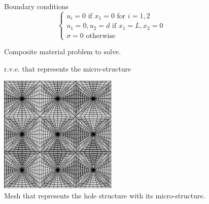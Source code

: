 \begin{figure}[h!]
\fboxsep=0pt
\noindent
\begin{minipage}[t]{0.35\linewidth}
\vspace{0pt}
\begin{flushleft}
\resizebox{6cm}{!}{
 
}
\end{flushleft}
\end{minipage}
\begin{minipage}[t]{0.4\linewidth}
\vspace{0pt}
Boundary conditions
\[
\begin{cases}
   u_i = 0 \text{ if } x_1 = 0 \text{ for } i=1,2\\
   u_1 = 0, u_2 = d \text{ if } x_1 = L, x_2 = 0\\
   \sigma = 0 \text{ otherwise}
\end{cases}
\]
\end{minipage}
\caption{Composite material problem to solve.}
\label{fig_rve_measures}
\end{figure}

\begin{figure}[h!]
\resizebox{6cm}{!}{
 
}
\caption{r.v.e. that represents the micro-structure}
\label{fig_rve_measures}
\end{figure}


\begin{figure}[h!]
\resizebox{2cm}{!}{
 
}
\end{figure}

\begin{figure}[h!]
\resizebox{5cm}{!}{
 
}
\end{figure}

\begin{figure}[h!]
  \includegraphics[width=0.5\textwidth]{figures/mesh-struc.pdf}
  \caption{Mesh that represents the hole structure with its micro-structure.}
  \label{fig_mesh_struc_micro}
\end{figure}

